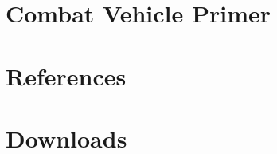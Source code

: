 \documentclass{article}
\newcommand{\mysectiontitle}{}
\newcommand{\newsection}[2]{\renewcommand{\mysectiontitle}{#2}\section{#1}}
\begin{document}


\newpage

\newsection{Combat Vehicle Primer}{combat-vehicle-primer}
\label{sec:combat_vehicle_primer}



\newpage

\newsection{References}{references}
\label{sec:references}



\newpage

\newsection{Downloads}{downloads}
\label{sec:downloads}



\newpage
\end{document}
